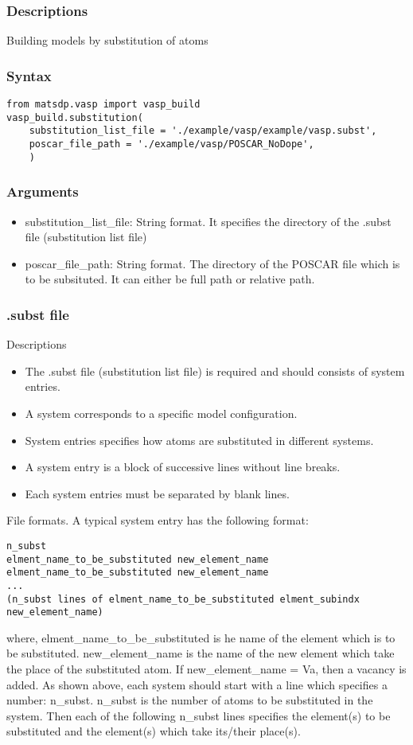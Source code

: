 \documentclass[12pt]{book}
\begin{document}
\subsubsection{Descriptions}
Building models by substitution of atoms
\subsubsection{Syntax}
\begin{lstlisting}
from matsdp.vasp import vasp_build
vasp_build.substitution(
    substitution_list_file = './example/vasp/example/vasp.subst',
    poscar_file_path = './example/vasp/POSCAR_NoDope',
    )
\end{lstlisting}
\subsubsection{Arguments}
\begin{itemize}
\item substitution\_list\_file: String format. It specifies the directory of the .subst file (substitution list file)
\item poscar\_file\_path: String format. The directory of the POSCAR file which is to be subsituted. It can either be full path or relative path.
\end{itemize}

\subsubsection{.subst file}

Descriptions
\begin{itemize}
\item The .subst file (substitution list file) is required and should consists of system entries.
\item A system corresponds to a specific model configuration.
\item System entries specifies how atoms are substituted in different systems.
\item A system entry is a block of successive lines without line breaks.
\item Each system entries must be separated by blank lines.
\end{itemize}

File formats. A typical system entry has the following format:
\begin{lstlisting}
n_subst
elment_name_to_be_substituted new_element_name
elment_name_to_be_substituted new_element_name
...
(n_subst lines of elment_name_to_be_substituted elment_subindx new_element_name)
\end{lstlisting}
where,
elment\_name\_to\_be\_substituted is he name of the element which is to be substituted.
new\_element\_name is the name of the new element which take the place of the substituted atom. If new\_element\_name = Va, then a vacancy is added.
As shown above, each system should start with a line which specifies a number: n\_subst.
n\_subst is the number of atoms to be substituted in the system.
Then each of the following n\_subst lines specifies the element(s) to be substituted and the element(s) which take its/their place(s).
\end{document}
